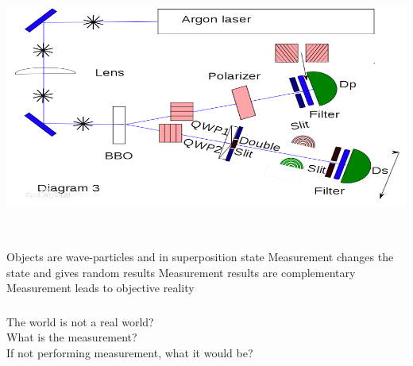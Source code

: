 \begin{frame}
    \frametitle{}
    \begin{center}
        \includegraphics[width=1.0\textwidth]{figs/chachuexp_3.png} \\
    \end{center} 
\end{frame}

\begin{frame}
    \begin{tcolorbox4}[Conclusion]
        ~~\\
    \begin{enumerate}
        \Item Objects are wave-particles and in superposition state
        \Item Measurement changes the state and gives random results
        \Item Measurement results are complementary
        \Item Measurement leads to objective reality
    \end{enumerate}
    \end{tcolorbox4}
\end{frame}

\begin{frame}
    \frametitle{}
    \centering
    {
      \large  {The world is not a real world?\\
      What is the measurement? \\
      If not performing measurement, what it would be?}
    }
\end{frame}
